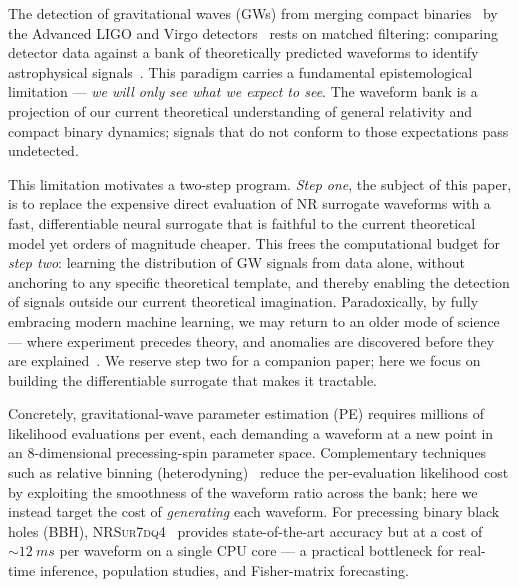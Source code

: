 \documentclass[aps,prd,twocolumn,superscriptaddress,longbibliography]{revtex4-2}
\newcommand{\NRSur}{\textsc{NRSur7dq4}}
\begin{document}
The detection of gravitational waves (GWs) from merging compact
binaries~\cite{LVK:GW150914} by the Advanced LIGO and Virgo
detectors~\cite{aLIGO:2015,AdVirgo:2015} rests on matched filtering:
comparing detector data against a bank of theoretically predicted
waveforms to identify astrophysical
signals~\cite{Maggiore:GWbook,Dhurandhar:1994,Allen:findchirp}.
This paradigm carries a fundamental epistemological limitation ---
\emph{we will only see what we expect to see}.
The waveform bank is a projection of our current theoretical understanding
of general relativity and compact binary dynamics;
signals that do not conform to those expectations pass undetected.

This limitation motivates a two-step program.
\emph{Step one}, the subject of this paper, is to replace the
expensive direct evaluation of NR surrogate waveforms with a
fast, differentiable neural surrogate that is faithful to the
current theoretical model yet orders of magnitude cheaper.
This frees the computational budget
for \emph{step two}: learning the distribution of GW signals
from data alone, without anchoring to any specific theoretical template,
and thereby enabling the detection of signals outside our
current theoretical imagination.
Paradoxically, by fully embracing modern machine learning,
we may return to an older mode of science ---
where experiment precedes theory, and anomalies are discovered
before they are explained~\cite{Modrekiladze:GW_AI:2024}.
We reserve step two for a companion paper; here we focus on
building the differentiable surrogate that makes it tractable.

Concretely, gravitational-wave parameter estimation (PE) requires
millions of likelihood evaluations per event, each demanding a waveform
at a new point in an 8-dimensional precessing-spin parameter space. Complementary techniques such as relative binning (heterodyning)~\cite{Zackay:2018qdy}
reduce the per-evaluation likelihood cost by exploiting the smoothness of the waveform ratio across the bank; here we instead target the cost of
\emph{generating} each waveform.
For precessing binary black holes (BBH), \NRSur{}~\cite{Varma:2019csw}
provides state-of-the-art accuracy but at a cost of $\sim\!\SI{12}{ms}$
per waveform on a single CPU core --- a practical bottleneck for
real-time inference, population studies, and Fisher-matrix forecasting.
\end{document}
